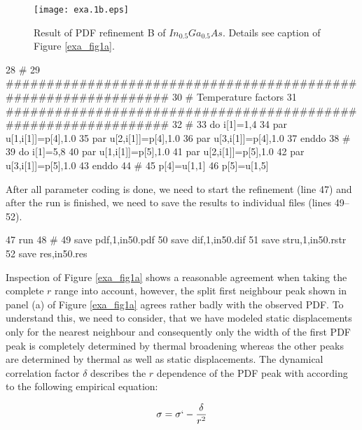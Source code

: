 \begin{figure}[!bth]
   \centering
   \texttt{[image: exa.1b.eps]}
   \caption[Result of PDF refinement B of $In_{0.5}Ga_{0.5}As$]
           {Result of PDF refinement B of $In_{0.5}Ga_{0.5}As$.
            Details see caption of Figure \ref{exa_fig1a}.}
   \label{exa_fig1b}
\end{figure}

\footnotesize
\begin{MacVerbatim}
     28 #
     29 ###############################################################
     30 # Temperature factors
     31 ###############################################################
     32 #
     33 do i[1]=1,4
     34   par u[1,i[1]]=p[4],1.0
     35   par u[2,i[1]]=p[4],1.0
     36   par u[3,i[1]]=p[4],1.0
     37 enddo
     38 #
     39 do i[1]=5,8
     40   par u[1,i[1]]=p[5],1.0
     41   par u[2,i[1]]=p[5],1.0
     42   par u[3,i[1]]=p[5],1.0
     43 enddo
     44 #
     45 p[4]=u[1,1]
     46 p[5]=u[1,5]
\end{MacVerbatim}
\normalsize

\noindent After all parameter coding is done, we need to start the
refinement (line 47) and after the run is finished, we need to
save the results to individual files (lines 49--52).

\footnotesize
\begin{MacVerbatim}
     47 run
     48 #
     49 save pdf,1,in50.pdf
     50 save dif,1,in50.dif
     51 save stru,1,in50.rstr
     52 save res,in50.res
\end{MacVerbatim}
\normalsize

\noindent Inspection of Figure \ref{exa_fig1a} shows a reasonable
agreement when taking the complete $r$ range into account,
however, the split first neighbour peak shown in panel (a) of
Figure \ref{exa_fig1a} agrees rather badly with the observed PDF.
To understand this, we need to consider, that we have modeled
static displacements only for the nearest neighbour and
consequently only the width of the first PDF peak is completely
determined by thermal broadening whereas the other peaks are
determined by thermal as well as static displacements. The
dynamical correlation factor $\delta$ describes the $r$ dependence
of the PDF peak with according to the following empirical
equation:

\begin{equation}
  \sigma = \sigma` - \frac{\delta}{r^{2}}
\end{equation}

